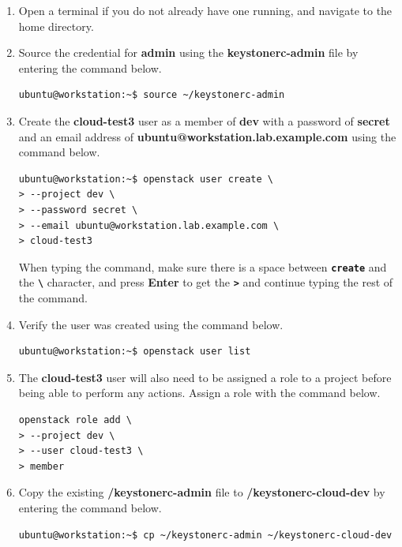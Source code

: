 \documentclass[letterpaper, 12pt]{article}
\begin{document}
\begin{enumerate}
    \item Open a terminal if you do not already have one running, and navigate to the home directory.
    
    \item Source the credential for \textbf{admin} using the \textbf{keystonerc-admin} file by entering the command
    below.
\begin{lstlisting}
ubuntu@workstation:~$ source ~/keystonerc-admin
\end{lstlisting}

    \item Create the \textbf{cloud-test3} user as a member of \textbf{dev} with a password of \textbf{secret} and an
    email address of \textbf{ubuntu@workstation.lab.example.com} using the command below.
\begin{lstlisting}
ubuntu@workstation:~$ openstack user create \
> --project dev \
> --password secret \
> --email ubuntu@workstation.lab.example.com \
> cloud-test3
\end{lstlisting}

    \begin{tipbox}{}
        When typing the command, make sure there is a space between \textbf{\texttt{create}} and the
        \textbf{\texttt{\textbackslash}} character, and press \textbf{Enter} to get the \textbf{\texttt{>}} and continue
        typing the rest of the command.
    \end{tipbox}

    \item Verify the user was created using the command below.
\begin{lstlisting}
ubuntu@workstation:~$ openstack user list
\end{lstlisting}

    \item The \textbf{cloud-test3} user will also need to be assigned a role to a project before being able to perform
    any actions. Assign a role with the command below.
\begin{lstlisting}
openstack role add \
> --project dev \
> --user cloud-test3 \
> member
\end{lstlisting}

    \item Copy the existing \textbf{\texttildemid/keystonerc-admin} file to \textbf{\texttildemid/keystonerc-cloud-dev}
    by entering the command below.
    \label{it:copy_keystone}
\begin{lstlisting}
ubuntu@workstation:~$ cp ~/keystonerc-admin ~/keystonerc-cloud-dev
\end{lstlisting}


\end{enumerate}
\end{document}
